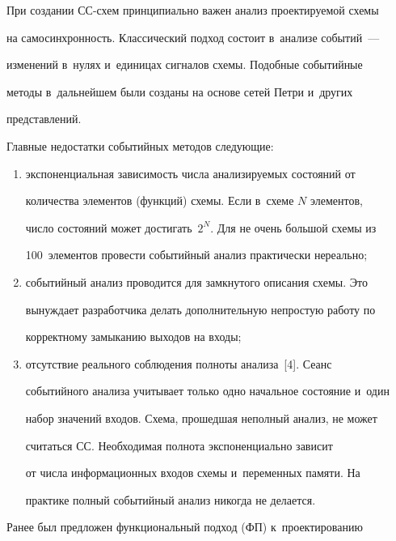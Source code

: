    


   При создании СС-схем принципиально важен анализ проектируемой схемы 


на самосинхронность. Классический подход состоит в~анализе событий~--- 


изменений в~нулях и~единицах сигналов схемы. Подобные событийные 


методы в~дальнейшем были созданы на основе сетей Петри и~других 


представлений.


     


     Главные недостатки событийных методов следующие:


\begin{enumerate}[(1)]


\item экспоненциальная зависимость числа анализируемых состояний от 


количества элементов (функций) схемы. Если в~схеме $N$ элементов, 


число состояний может достигать~$2^N$. Для не очень большой схемы из 


100~элементов провести событийный анализ практически нереально;


\item событийный анализ проводится для замкнутого описания схемы. Это 


вынуждает разработчика делать дополнительную непростую работу по 


корректному замыканию выходов на входы;


\item отсутствие реального соблюдения полноты анализа~[4]. Сеанс 


событийного анализа учитывает только одно начальное состояние и~один 


набор значений входов. Схема, прошедшая неполный анализ, не может 


считаться СС. Необходимая полнота экспоненциально зависит 


от числа информационных входов схемы и~переменных памяти. На 


практике полный событийный анализ никогда не делается.


   \end{enumerate}


   


   Ранее был предложен функциональный подход (ФП) к~проектированию 


